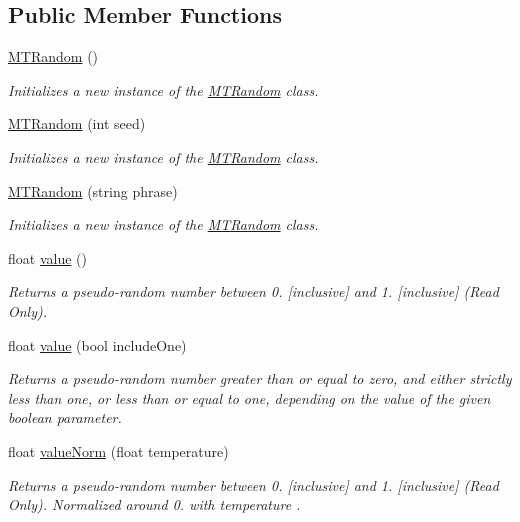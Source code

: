 \subsection*{Public Member Functions}
\begin{DoxyCompactItemize}
\item 
\hyperlink{class_m_t_random_af0a395715fa76193de56b49a98bef41d}{M\+T\+Random} ()
\begin{DoxyCompactList}\small\item\em Initializes a new instance of the \hyperlink{class_m_t_random}{M\+T\+Random} class. \end{DoxyCompactList}\item 
\hyperlink{class_m_t_random_a6c49868b07fd6300f99877fdd7115997}{M\+T\+Random} (int seed)
\begin{DoxyCompactList}\small\item\em Initializes a new instance of the \hyperlink{class_m_t_random}{M\+T\+Random} class. \end{DoxyCompactList}\item 
\hyperlink{class_m_t_random_a2ca2ad75c477b008d70380f9fd03c9a6}{M\+T\+Random} (string phrase)
\begin{DoxyCompactList}\small\item\em Initializes a new instance of the \hyperlink{class_m_t_random}{M\+T\+Random} class. \end{DoxyCompactList}\item 
float \hyperlink{class_m_t_random_ad0cc614bc3b023f2036e6a0bc5532763}{value} ()
\begin{DoxyCompactList}\small\item\em Returns a pseudo-\/random number between 0. \mbox{[}inclusive\mbox{]} and 1. \mbox{[}inclusive\mbox{]} (Read Only). \end{DoxyCompactList}\item 
float \hyperlink{class_m_t_random_a6406f326587e9cb869277f97ffa56f83}{value} (bool include\+One)
\begin{DoxyCompactList}\small\item\em Returns a pseudo-\/random number greater than or equal to zero, and either strictly less than one, or less than or equal to one, depending on the value of the given boolean parameter. \end{DoxyCompactList}\item 
float \hyperlink{class_m_t_random_a56cf43aef8ed6504c5c4d8fd379704df}{value\+Norm} (float temperature)
\begin{DoxyCompactList}\small\item\em Returns a pseudo-\/random number between 0. \mbox{[}inclusive\mbox{]} and 1. \mbox{[}inclusive\mbox{]} (Read Only). Normalized around 0. with {\itshape temperature} . \end{DoxyCompactList}\item 

\end{DoxyCompactItemize}
